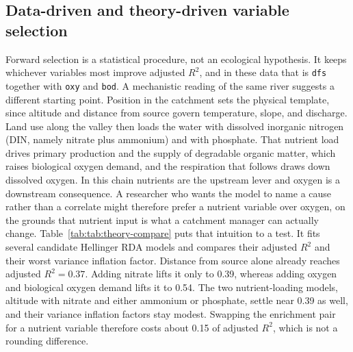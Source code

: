 \documentclass[11pt]{article}
\begin{document}
\subsection{Data-driven and theory-driven variable selection}
Forward selection is a statistical procedure, not an ecological hypothesis. It keeps whichever variables most improve adjusted $R^2$, and in these data that is \texttt{dfs} together with \texttt{oxy} and \texttt{bod}. A mechanistic reading of the same river suggests a different starting point. Position in the catchment sets the physical template, since altitude and distance from source govern temperature, slope, and discharge. Land use along the valley then loads the water with dissolved inorganic nitrogen (DIN, namely nitrate plus ammonium) and with phosphate. That nutrient load drives primary production and the supply of degradable organic matter, which raises biological oxygen demand, and the respiration that follows draws down dissolved oxygen. In this chain nutrients are the upstream lever and oxygen is a downstream consequence. A researcher who wants the model to name a cause rather than a correlate might therefore prefer a nutrient variable over oxygen, on the grounds that nutrient input is what a catchment manager can actually change.
Table~\ref{tab:tab:theory-compare} puts that intuition to a test. It fits several candidate Hellinger RDA models and compares their adjusted $R^2$ and their worst variance inflation factor. Distance from source alone already reaches adjusted $R^2 = 0.37$. Adding nitrate lifts it only to 0.39, whereas adding oxygen and biological oxygen demand lifts it to 0.54. The two nutrient-loading models, altitude with nitrate and either ammonium or phosphate, settle near 0.39 as well, and their variance inflation factors stay modest. Swapping the enrichment pair for a nutrient variable therefore costs about 0.15 of adjusted $R^2$, which is not a rounding difference.
\end{document}
